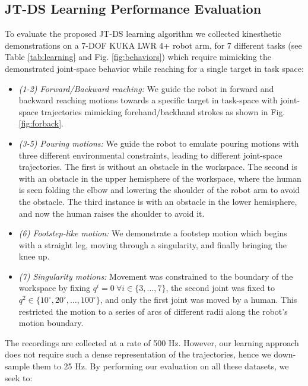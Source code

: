 \documentclass[letterpaper, 10 pt, journal, twoside, fleqn]{IEEEtran}
\begin{document}
\subsection{JT-DS Learning Performance  Evaluation}
To evaluate the proposed JT-DS learning algorithm we collected kinesthetic demonstrations on a 7-DOF KUKA LWR 4+ robot arm, for 7 different tasks (see Table \ref{tab:learning} and Fig. \ref{fig:behaviors}) which require mimicking the demonstrated joint-space behavior while reaching for a single target in task space:
\begin{itemize}[leftmargin=*]
\item \textit{(1-2) Forward/Backward reaching:} We guide the robot in forward and backward reaching motions towards a specific target in task-space with joint-space trajectories mimicking forehand/backhand strokes as shown in Fig. \ref{fig:forback}.  
\item \textit{(3-5) Pouring motions:} We guide the robot to emulate pouring motions with three different environmental constraints, leading to different joint-space trajectories. The first is without an obstacle in the workspace. The second is with an obstacle in the upper hemisphere of the workspace, where the human is seen folding the elbow and lowering the shoulder of the robot arm to avoid the obstacle. The third instance is with an obstacle in the lower hemisphere, and now the human raises the shoulder to avoid it.
\item \textit{(6) Footstep-like motion:} We demonstrate a footstep motion which begins with a straight leg, moving through a singularity, and finally bringing the knee up.
\item \textit{(7) Singularity motions:} Movement was constrained to the boundary of the workspace by fixing $ q^i=0~\forall i\in\{3,\dots,7\}$, the second joint was fixed to $q^2\in\{10^\circ,20^\circ,\dots,100^\circ\}$, and only the first joint was moved by a human. This restricted the motion to a series of arcs of different radii along the robot's motion boundary.  
\end{itemize}

\noindent   The recordings are collected at a rate of 500 Hz. However, our learning approach does not require such a dense representation of the trajectories, hence we down-sample them to 25 Hz. By performing our evaluation on all these datasets, we seek to: 
\end{document}
